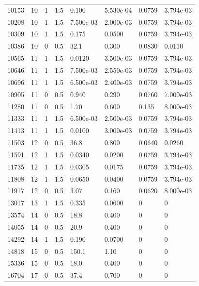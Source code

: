 \documentclass[preview]{standalone}
\begin{document}
{{{\begin{tabular}{L{1.2cm}C{1.2cm} C{0.3cm}C{0.5cm} C{1.4cm}C{1.4cm} C{1.4cm}C{1.4cm}}
  10153  &    10  & 1     & 1.5 &  0.100  & 5.530e-04  & 0.0759 &  3.794e-03   \\ 
  10208  &    10  & 1     & 1.5 &  7.500e-03  & 2.000e-03  & 0.0759 &  3.794e-03   \\ 
  10309  &    10  & 1     & 1.5 &  0.175  & 0.0500  & 0.0759 &  3.794e-03   \\ 
  10386  &    10  & 0     & 0.5 &  32.1  & 0.300  & 0.0830 &  0.0110   \\ 
  10565  &    11  & 1     & 1.5 &  0.0120  & 3.500e-03  & 0.0759 &  3.794e-03   \\ 
  10646  &    11  & 1     & 1.5 &  7.500e-03  & 2.550e-03  & 0.0759 &  3.794e-03   \\ 
  10696  &    11  & 1     & 1.5 &  6.500e-03  & 2.400e-03  & 0.0759 &  3.794e-03   \\ 
  10905  &    11  & 0     & 0.5 &  0.940  & 0.290  & 0.0760 &  7.000e-03   \\ 
  11280  &    11  & 0     & 0.5 &  1.70  & 0.600  & 0.135 &  8.000e-03   \\ 
  11333  &    11  & 1     & 1.5 &  6.500e-03  & 2.500e-03  & 0.0759 &  3.794e-03   \\ 
  11413  &    11  & 1     & 1.5 &  0.0100  & 3.000e-03  & 0.0759 &  3.794e-03   \\ 
  11503  &    12  & 0     & 0.5 &  36.8  & 0.800  & 0.0640 &  0.0260   \\ 
  11591  &    12  & 1     & 1.5 &  0.0340  & 0.0200  & 0.0759 &  3.794e-03   \\ 
  11735  &    12  & 1     & 1.5 &  0.0305  & 0.0175  & 0.0759 &  3.794e-03   \\ 
  11808  &    12  & 1     & 1.5 &  0.0650  & 0.0400  & 0.0759 &  3.794e-03   \\ 
  11917  &    12  & 0     & 0.5 &  3.07  & 0.160  & 0.0620 &  8.000e-03   \\ 
  13017  &    13  & 1     & 1.5 &  0.335  & 0.0600  & 0 &  0   \\ 
  13574  &    14  & 0     & 0.5 &  18.8  & 0.400  & 0 &  0   \\ 
  14055  &    14  & 0     & 0.5 &  20.9  & 0.400  & 0 &  0   \\ 
  14292  &    14  & 1     & 1.5 &  0.190  & 0.0700  & 0 &  0   \\ 
  14818  &    15  & 0     & 0.5 &  150.1  & 1.10  & 0 &  0   \\ 
  15336  &    15  & 0     & 0.5 &  18.0  & 0.400  & 0 &  0   \\ 
  16704  &    17  & 0     & 0.5 &  37.4  & 0.700  & 0 &  0   \\ 

\end{tabular}}}}
\end{document}

